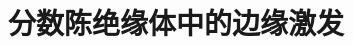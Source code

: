 \documentclass[cs4size, a4paper, twoside]{sjtuthesis}
\begin{document}

\title{分数陈绝缘体中的边缘激发}
%

\maketitle


\makeenglishtitle

\frontmatter



\tableofcontents


%

\mainmatter







\appendix

\renewcommand\theequation{\Alph{chapter}--\arabic{equation}}
\renewcommand\thefigure{\Alph{chapter}--\arabic{figure}}
\renewcommand\thetable{\Alph{chapter}--\arabic{table}}


\end{document}
